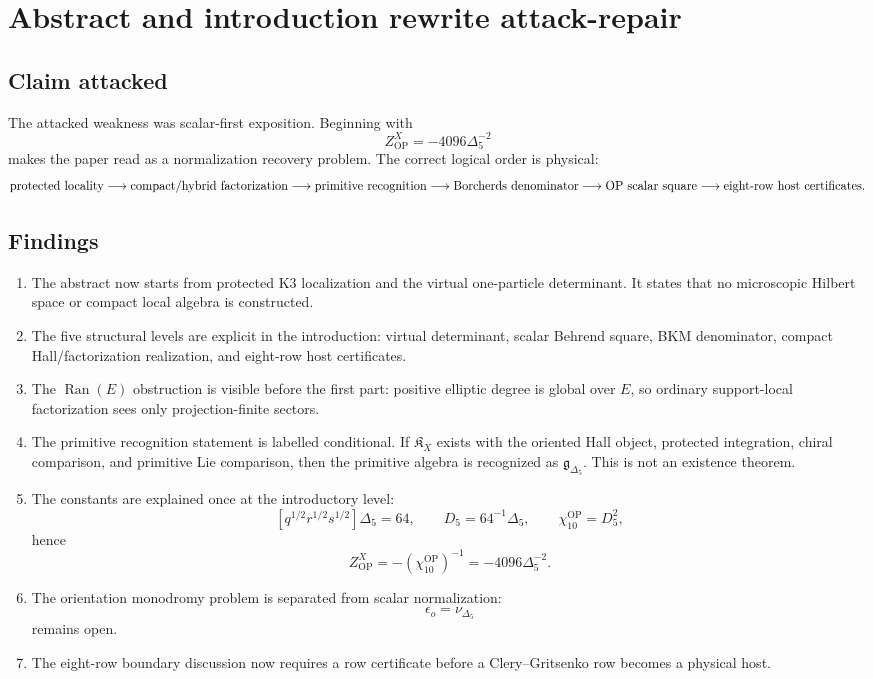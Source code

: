 \section{Abstract and introduction rewrite attack-repair}
\label{sec:intro-rewrite-attack-repair}

\subsection{Claim attacked}

The attacked weakness was scalar-first exposition.  Beginning with
\[
Z^X_{\mathrm{OP}}=-4096\Delta_5^{-2}
\]
makes the paper read as a normalization recovery problem.  The correct
logical order is physical:
\[
\hbox{protected locality}
\longrightarrow
\hbox{compact/hybrid factorization}
\longrightarrow
\hbox{primitive recognition}
\longrightarrow
\hbox{Borcherds denominator}
\longrightarrow
\hbox{OP scalar square}
\longrightarrow
\hbox{eight-row host certificates}.
\]

\subsection{Findings}

\begin{enumerate}
\item The abstract now starts from protected K3 localization and the
virtual one-particle determinant.  It states that no microscopic Hilbert
space or compact local algebra is constructed.
\item The five structural levels are explicit in the introduction:
virtual determinant, scalar Behrend square, BKM denominator, compact
Hall/factorization realization, and eight-row host certificates.
\item The \(\operatorname{Ran}(E)\) obstruction is visible before the
first part: positive elliptic degree is global over \(E\), so ordinary
support-local factorization sees only projection-finite sectors.
\item The primitive recognition statement is labelled conditional.  If
\(\mathfrak K_X\) exists with the oriented Hall object, protected
integration, chiral comparison, and primitive Lie comparison, then the
primitive algebra is recognized as \(\mathfrak g_{\Delta_5}\).  This is
not an existence theorem.
\item The constants are explained once at the introductory level:
\[
[q^{1/2}r^{1/2}s^{1/2}]\Delta_5=64,\qquad
D_5=64^{-1}\Delta_5,\qquad
\chi_{10}^{\mathrm{OP}}=D_5^2,
\]
hence
\[
Z^X_{\mathrm{OP}}=-(\chi_{10}^{\mathrm{OP}})^{-1}
=-4096\Delta_5^{-2}.
\]
\item The orientation monodromy problem is separated from scalar
normalization:
\[
\epsilon_o=\nu_{\Delta_5}
\]
remains open.
\item The eight-row boundary discussion now requires a row certificate
before a Clery--Gritsenko row becomes a physical host.
\end{enumerate}

